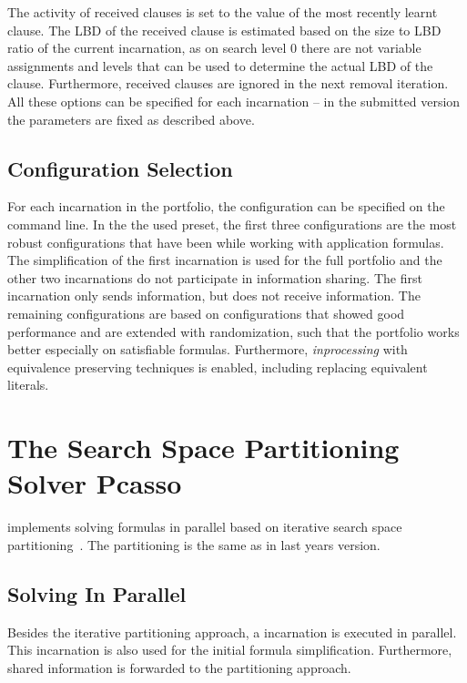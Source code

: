 \documentclass[conference]{IEEEtran}
\begin{document}
The activity of received clauses is set to the value of the most recently learnt clause. 
The LBD of the received clause is estimated based on the size to LBD ratio of the current incarnation, as on search level $0$ there are not variable assignments and levels that can be used to determine the actual LBD of the clause. 
Furthermore, received clauses are ignored in the next removal iteration. 
All these options can be specified for each incarnation -- in the submitted version the parameters are fixed as described above. 

\subsection{Configuration Selection}

For each incarnation in the portfolio, the configuration can be specified on the command line. 
In the the used preset, the first three configurations are the most robust configurations that have been while working with application formulas. 
The simplification of the first incarnation is used for the full portfolio and the other two incarnations do not participate in information sharing. 
The first incarnation only sends information, but does not receive information. 
The remaining configurations are based on configurations that showed good performance and are extended with randomization, such that the portfolio works better especially on satisfiable formulas. 
Furthermore, \emph{inprocessing} with equivalence preserving techniques is enabled, including replacing equivalent literals. 

\section{The Search Space Partitioning Solver Pcasso}

\pcasso implements solving formulas in parallel based on iterative search space partitioning~\cite{Miterative-splitting}. 
The partitioning is the same as in last years version. 

\subsection{Solving In Parallel}

Besides the iterative partitioning approach, a \priss incarnation is executed in parallel. 
This incarnation is also used for the initial formula simplification. 
Furthermore, shared information is forwarded to the partitioning approach. 
\end{document}

